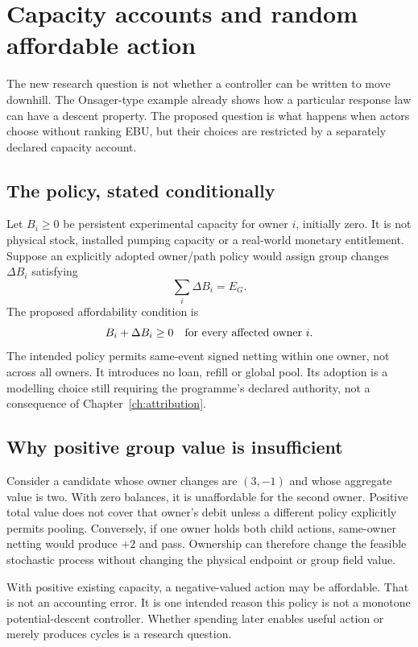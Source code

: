 \chapter{Capacity accounts and random affordable action}\label{ch:capacity}
The new research question is not whether a controller can be written to
move downhill. The Onsager-type example already shows how a particular
response law can have a descent property. The proposed question is what
happens when actors choose without ranking EBU, but their choices are
restricted by a separately declared capacity account.

\section{The policy, stated conditionally}
Let $B_i\geq0$ be persistent experimental capacity for owner $i$, initially
zero. It is not physical stock, installed pumping capacity or a real-world
monetary entitlement. Suppose an explicitly adopted owner/path policy would
assign group changes $\Delta B_i$ satisfying
\begin{equation}
 \sum_i\Delta B_i=E_G.
\end{equation}
The proposed affordability condition is
\begin{equation}
 B_i+\Delta B_i\geq0\quad\hbox{for every affected owner }i.
\end{equation}
The intended policy permits same-event signed netting within one owner,
not across all owners. It introduces no loan, refill or global pool.
Its adoption is a modelling choice still requiring the programme's declared
authority, not a consequence of Chapter~\ref{ch:attribution}.

\section{Why positive group value is insufficient}
Consider a candidate whose owner changes are $(3,-1)$ and whose aggregate
value is two. With zero balances, it is unaffordable for the second owner.
Positive total value does not cover that owner's debit unless a different
policy explicitly permits pooling. Conversely, if one owner holds both
child actions, same-owner netting would produce $+2$ and pass. Ownership
can therefore change the feasible stochastic process without changing the
physical endpoint or group field value.

With positive existing capacity, a negative-valued action may be affordable.
That is not an accounting error. It is one intended reason this policy is
not a monotone potential-descent controller. Whether spending later enables
useful action or merely produces cycles is a research question.

